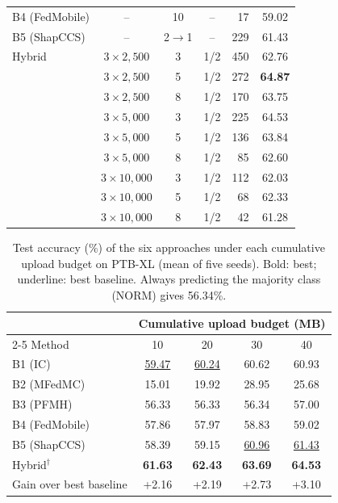\documentclass[sigconf]{acmart}
\newcommand{\method}{Hybrid}   %
\begin{document}
\begin{table}[!tp]
\begin{tabular}[t]{@{}l c c c r c@{}}
B4 (FedMobile) & -- & 10 & -- & 17 & 59.02 \\
B5 (ShapCCS) & -- & 2$\to$1 & -- & 229 & 61.43 \\
\method{} & $3\times2{,}500$ & 3 & 1/2 & 450 & 62.76 \\
 & $3\times2{,}500$ & 5 & 1/2 & 272 & \textbf{64.87} \\
 & $3\times2{,}500$ & 8 & 1/2 & 170 & 63.75 \\
 & $3\times5{,}000$ & 3 & 1/2 & 225 & 64.53\rlap{$^\dagger$} \\
 & $3\times5{,}000$ & 5 & 1/2 & 136 & 63.84 \\
 & $3\times5{,}000$ & 8 & 1/2 & 85 & 62.60 \\
 & $3\times10{,}000$ & 3 & 1/2 & 112 & 62.03 \\
 & $3\times10{,}000$ & 5 & 1/2 & 68 & 62.33 \\
 & $3\times10{,}000$ & 8 & 1/2 & 42 & 61.28 \\
\bottomrule
\end{tabular}
\end{table}

\begin{table}[t]
  \caption{Test accuracy (\%) of the six approaches under each cumulative upload budget on PTB-XL (mean of five seeds). Bold: best; underline: best baseline. Always predicting the majority class (NORM) gives 56.34\%.}
  \label{tab:ptbxl_summary}
  \centering
  \footnotesize
  \setlength{\tabcolsep}{5pt}
  \begin{tabular}{@{}l cccc@{}}
  \toprule
   & \multicolumn{4}{c}{Cumulative upload budget (MB)} \\
  \cmidrule(l){2-5}
  Method & 10 & 20 & 30 & 40 \\
  \midrule
  B1 (IC)        & \underline{59.47} & \underline{60.24} & 60.62 & 60.93 \\
  B2 (MFedMC)    & 15.01 & 19.92 & 28.95 & 25.68 \\
  B3 (PFMH)      & 56.33 & 56.33 & 56.34 & 57.00 \\
  B4 (FedMobile) & 57.86 & 57.97 & 58.83 & 59.02 \\
  B5 (ShapCCS)   & 58.39 & 59.15 & \underline{60.96} & \underline{61.43} \\
  \method{}$^\dagger$ & \textbf{61.63} & \textbf{62.43} & \textbf{63.69} & \textbf{64.53} \\
  \midrule
  Gain over best baseline & +2.16 & +2.19 & +2.73 & +3.10 \\
  \bottomrule
  \end{tabular}
\end{table}
\end{document}
